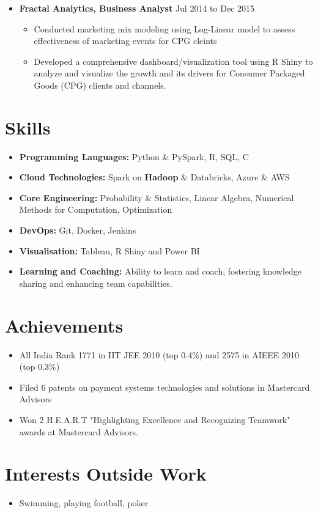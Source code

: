 \documentclass[a4paper,10pt]{article}
\begin{document}
\begin{itemize}[leftmargin=0.2cm, label={}]
    \item \textbf{Fractal Analytics, Business Analyst} \hfill \textnormal{Jul 2014 to Dec 2015}
    \begin{itemize}[leftmargin=0.5cm, label={\textbullet}]
        \item Conducted marketing mix modeling using Log-Linear model to assess effectiveness of marketing events for CPG cleints 
        \item Developed a comprehensive dashboard/visualization tool using R Shiny to analyze and visualize the growth and its drivers for Consumer Packaged Goods (CPG) clients
        and channels.
    \end{itemize}
\end{itemize}

\section*{Skills}
\begin{itemize}[leftmargin=0.2cm, label={}]
    \item \textbf{Programming Languages:} Python \& PySpark, R, SQL, C
    \item \textbf{Cloud Technologies:} Spark on {\textbf{Hadoop}} \& Databricks, Azure \& AWS 
    \item \textbf{Core Engineering:} Probability \& Statistics, Linear Algebra, Numerical Methods for Computation, Optimization
    \item \textbf{DevOps:} Git, Docker, Jenkins
    \item \textbf{Visualisation:} Tableau, R Shiny and Power BI
    \item \textbf{Learning and Coaching:} Ability to learn and coach, fostering knowledge sharing and enhancing team capabilities.
\end{itemize}

\section*{Achievements}
\begin{itemize}[leftmargin=0.2cm, label={}]
    \item All India Rank 1771 in IIT JEE 2010 (top 0.4\%) and 2575 in AIEEE 2010 (top 0.3\%)
    \item Filed 6 patents on payment systems technologies and solutions in Mastercard Advisors
    \item Won 2 H.E.A.R.T "Highlighting Excellence and Recognizing Teamwork" awards at Mastercard Advisors.
\end{itemize}

\section*{Interests Outside Work}
\begin{itemize}[leftmargin=0.2cm, label={}]
    \item Swimming, playing football, poker
\end{itemize}
\end{document}
